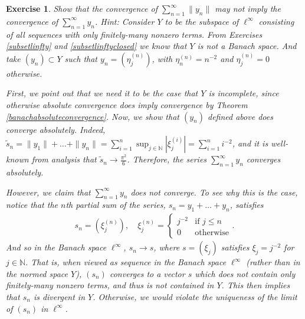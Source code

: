 \documentclass[11pt]{article}
\theoremstyle{mystyle}
\newtheorem{protoexer}{Exercise}[section]
\newenvironment{exer}
{\colorlet{shadecolor}{blue!15}\begin{shaded}\begin{protoexer}}
{\end{protoexer}\end{shaded}}
\newcommand{\0}{\mathbf{0}}
\begin{document}
\begin{exer}
Show that the convergence of $\sum_{n=1}^{\infty} \|y_n\|$ may not imply the convergence of $\sum_{n=1}^{\infty} y_n$.\newline
Hint: Consider $Y$ to be the subspace of $\ell^{\infty}$ consisting of all sequences with only finitely-many nonzero terms. From Exercises \ref{subsetlinfty} and \ref{subsetlinftyclosed} we know that $Y$ is not a Banach space. And take $(y_n) \subset Y$ such that $y_n = \left(\eta_j^{(n)} \right)$, with $\eta_n^{(n)} = n^{-2}$ and $\eta_j^{(n)} = 0$ otherwise.

First, we point out that we need it to be the case that $Y$ is incomplete, since otherwise absolute convergence does imply convergence by Theorem \ref{banachabsoluteconvergence}. Now, we show that $(y_n)$ defined above does converge absolutely. Indeed, $\tilde{s}_n = \|y_1\| +\ldots +\|y_n\| = \sum_{i=1}^n \sup_{j \in \mathbb{N}}|\xi_j^{(i)}| = \sum_{i=1}^n i^{-2}$, and it is well-known from analysis that $\tilde{s}_n \longrightarrow \frac{\pi^2}{6}$. Therefore, the series $\sum_{n=1}^{\infty} y_n$ converges absolutely.

However, we claim that $\sum_{n=1}^{\infty} y_n$ does not converge. To see why this is the case, notice that the $n$th partial sum of the series, $s_n = y_1 + \ldots + y_n$, satisfies
\begin{align*}
    s_n = \left(\xi_j^{(n)} \right), \quad \xi_j^{(n)} = 
    \begin{cases}
    j^{-2} & \text{if $j \leq n$}\\
    0 & \text{otherwise}
    \end{cases}.
\end{align*}
And so in the Banach space $\ell^{\infty}$, $s_n \longrightarrow s$, where $s = (\xi_j)$ satisfies $\xi_j = j^{-2}$ for $j \in \mathbb{N}$. That is, when viewed as sequence in the Banach space $\ell^{\infty}$ (rather than in the normed space $Y$), $(s_n)$ converges to a vector $s$ which does not contain only finitely-many nonzero terms, and thus is not contained in $Y$. This then implies that $s_n$ is divergent in $Y$. Otherwise, we would violate the uniqueness of the limit of $(s_n)$ in $\ell^{\infty}$.
\end{exer}
\end{document}

